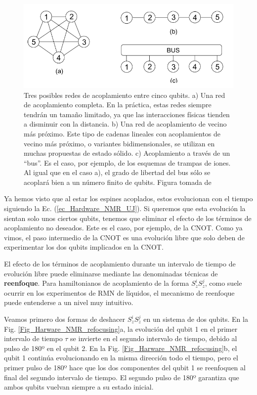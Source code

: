 	\begin{figure}[H]
	\centering 
	\includegraphics[width=0.65\linewidth]{Figuras/Fig_Harware_NMR_posible_couplings.png}
	\caption{Tres posibles redes de acoplamiento entre cinco qubits. a) Una red de acoplamiento completa. En la práctica, estas redes siempre tendrán un tamaño limitado, ya que las interacciones físicas tienden a disminuir con la distancia. b) Una red de acoplamiento de vecino más próximo. Este tipo de cadenas lineales con acoplamientos de vecino más próximo, o variantes bidimensionales, se utilizan en muchas propuestas de estado sólido. c) Acoplamiento a través de un ``bus''. Es el caso, por ejemplo, de los esquemas de trampas de iones. Al igual que en el caso a), el grado de libertad del bus sólo se acoplará bien a un número finito de qubits. Figura tomada de \cite{bib_NMR_hardware}}
	\label{Fig_Harware_NMR_posible_couplings}
	\end{figure}







Ya hemos visto que al estar los espines acoplados, estos evolucionan con el tiempo siguiendo la Ec. (\ref{ec_Hardware_NMR_UJ}). Si queremos que esta evolución la sientan solo unos ciertos qubits, tenemos que eliminar el efecto de los términos de acoplamiento no deseados. Este es el caso, por ejemplo, de la CNOT. Como ya vimos, el paso intermedio de la CNOT es una evolución libre que solo deben de experimentar los dos qubits implicados en la CNOT. 

El efecto de los términos de acoplamiento durante un intervalo de tiempo de evolución libre puede eliminarse mediante las denominadas técnicas de \textbf{reenfoque}.  Para hamiltonianos de acoplamiento de la forma $S_z^i S_z^j$, como suele ocurrir en los experimentos de RMN de líquidos, el mecanismo de reenfoque puede entenderse a un nivel muy intuitivo. 

Veamos primero dos formas de deshacer $S_z^i S_z^j$ en un sistema de dos qubits. En la Fig. \ref{Fig_Harware_NMR_refocusing}a, la evolución del qubit 1 en el primer intervalo de tiempo $\tau$ se invierte en el segundo intervalo de tiempo, debido al pulso de 180º en el qubit 2. En la Fig. \ref{Fig_Harware_NMR_refocusing}b, el qubit 1 continúa evolucionando en la misma dirección todo el tiempo, pero el primer pulso de 180º hace que los dos componentes del qubit 1 se reenfoquen al final del segundo intervalo de tiempo. El segundo pulso de 180º garantiza que ambos qubits vuelvan siempre a su estado inicial.

